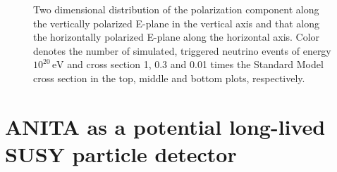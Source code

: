 \begin{figure}
\centering
{}\par 
{} \par 
{}
\caption{Two dimensional distribution of the polarization component along the vertically polarized E-plane in the vertical axis and that along the horizontally polarized E-plane along the horizontal axis. Color denotes the number of simulated, triggered neutrino events of energy $10^{20}\,\mbox{eV}$ and cross section 1, 0.3 and 0.01 times the Standard Model cross section in the top, middle and bottom plots, respectively.}
\label{sm_2d}
\end{figure}

\section{ANITA as a potential long-lived SUSY particle detector}
\label{susy}

